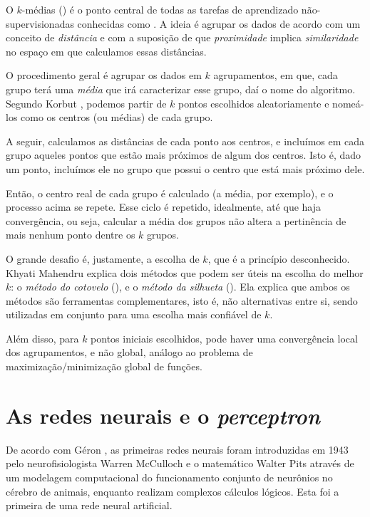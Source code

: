 O $k$-médias () é o ponto central de todas as tarefas de aprendizado não-supervisionadas conhecidas como . A ideia é agrupar os dados de acordo com um conceito de \emph{distância} e com a suposição de que \emph{proximidade} implica \emph{similaridade} no espaço em que calculamos essas distâncias.

O procedimento geral é agrupar os dados em $k$ agrupamentos, em que, cada grupo terá uma \emph{média} que irá caracterizar esse grupo, daí o nome do algoritmo. Segundo Korbut \citep{korbut}, podemos partir de $k$ pontos escolhidos aleatoriamente e nomeá-los como os centros (ou médias) de cada grupo.

A seguir, calculamos as distâncias de cada ponto aos centros, e incluímos em cada grupo aqueles pontos que estão mais próximos de algum dos centros. Isto é, dado um ponto, incluímos ele no grupo que possui o centro que está mais próximo dele.

Então, o centro real de cada grupo é calculado (a média, por exemplo), e o processo acima se repete. Esse ciclo é repetido, idealmente, até que haja convergência, ou seja, calcular a média dos grupos não altera a pertinência de mais nenhum ponto dentre os $k$ grupos.

O grande desafio é, justamente, a escolha de $k$, que é a princípio desconhecido. Khyati Mahendru \citep{means} explica dois métodos que podem ser úteis na escolha do melhor $k$: o \emph{método do cotovelo} (), e o \emph{método da silhueta} (). Ela explica que ambos os métodos são ferramentas complementares, isto é, não alternativas entre si, sendo utilizadas em conjunto para uma escolha mais confiável de $k$.

Além disso, para $k$ pontos iniciais escolhidos, pode haver uma convergência local dos agrupamentos, e não global, análogo ao problema de maximização/minimização global de funções.

\section{As redes neurais e o \emph{perceptron}}

De acordo com Géron \citep{hands}, as primeiras redes neurais foram introduzidas em 1943 pelo neurofisiologista Warren McCulloch e o matemático Walter Pits através de um modelagem computacional do funcionamento conjunto de neurônios no cérebro de animais, enquanto realizam complexos cálculos lógicos. Esta foi a primeira  de uma rede neural artificial.

